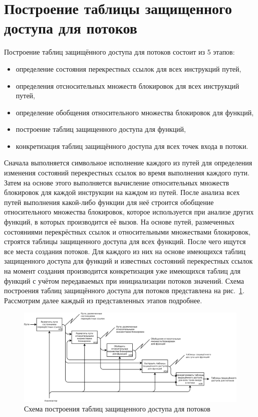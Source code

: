 \section{Построение таблицы защищенного доступа для потоков}

Построение таблиц защищённого доступа для потоков состоит из 5 этапов:

\begin{itemize}
  \item определение состояния перекрестных ссылок для всех инструкций путей,
  \item определения отсносительных множеств блокировок для всех инструкций путей,
  \item определение обобщения относительного множества блокировок для функций,
  \item построение таблиц защищенного доступа для функций,
  \item конкретизация таблиц защищённого доступа для всех точек входа в потоки.
\end{itemize}

Сначала выполняется символьное исполнение каждого из путей для определения изменения состояний перекрестных ссылок во время выполнения каждого пути. Затем на основе этого выполняется вычисление относительных множеств блокировок для каждой инструкции на каждом из путей. После анализа всех путей выполнения какой-либо функции для неё строится обобщение относительного множества блокировок, которое используется при анализе других  функций, в которых производится её вызов. На основе путей, размеченных состояниями перекрёстных ссылок и относительными множествами блокировок, строятся таблицы защищенного доступа для всех функций. После чего ищутся все места создания потоков.  Для каждого из них на основе имеющихся таблиц защищенного доступа для функций и известных состояний перекрестных ссылок на момент создания производится конкретизация уже имеющихся таблиц для функций с учётом передаваемых при инициализации потоков значений. Схема построения таблиц защищённого доступа для потоков представлена на рис.~\ref{fig:form-tables}. Рассмотрим далее каждый из представленных этапов подробнее.

\begin{figure}
  \centering
  \includegraphics[width=\textwidth]{inc/dia/form-tables}
  \caption{Схема построения таблиц защищенного доступа для потоков}
  \label{fig:form-tables}
\end{figure}

